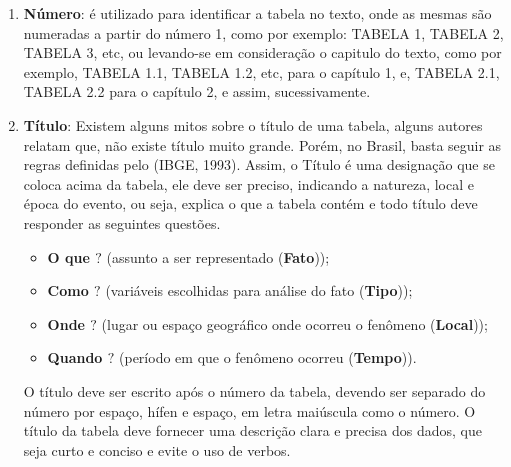\begin{enumerate}
  \item \textbf{Número}: é utilizado para identificar a tabela no texto, onde as mesmas são numeradas a partir do número 1, como por exemplo: TABELA 1, TABELA 2, TABELA 3, etc, ou levando-se em consideração o capitulo do texto, como por exemplo, TABELA 1.1, TABELA 1.2, etc, para o capítulo 1, e, TABELA 2.1, TABELA 2.2 para o capítulo 2, e assim, sucessivamente.
  \item \textbf{Título}: Existem alguns mitos sobre o título de uma tabela, alguns autores relatam que, não existe título muito grande. Porém, no Brasil, basta seguir as regras definidas pelo (IBGE, 1993). Assim, o Título é uma designação que se coloca acima da tabela, ele deve ser preciso,
  indicando a natureza, local e época do evento, ou seja, explica o que a tabela contém e todo título deve responder as seguintes questões.


\begin{itemize}
  \item \textbf{O que $?$}  (assunto a ser representado (\textbf{Fato}));
  \item \textbf{Como $?$}  (variáveis escolhidas para análise do fato (\textbf{Tipo}));
   \item \textbf{Onde $?$}   (lugar ou espaço geográfico onde ocorreu o fenômeno (\textbf{Local}));
    \item \textbf{Quando $?$} (período em que o fenômeno ocorreu (\textbf{Tempo})).
\end{itemize}

O título deve ser escrito após o número da tabela, devendo ser separado do número por espaço, hífen e espaço, em letra maiúscula como o número. O título da tabela deve fornecer uma descrição clara e precisa dos dados, que seja curto e conciso e evite o uso de verbos.


\end{enumerate}
